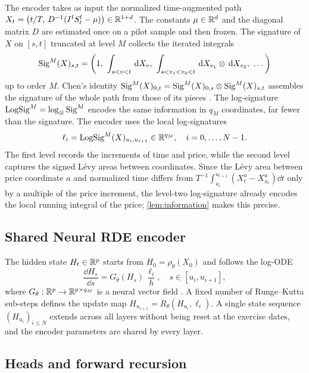 The encoder takes as input the normalized time-augmented path $X_t=\left(t/T,\,D^{-1}(I^{\mathrm f} S^{\mathrm f}_t-\mu)\right)\in\mathbb{R}^{1+d}$. The constants $\mu\in\mathbb{R}^d$ and the diagonal matrix $D$ are estimated once on a pilot sample and then frozen. The signature of $X$ on $[s,t]$ truncated at level $M$ collects the iterated integrals
\[
\Sig^{M}(X)_{s,t}=\left(1,\ \int_{s<v<t}\dd X_{v},\ \int_{s<v_1<v_2<t}\dd X_{v_1}\otimes\dd X_{v_2},\ \dots\right)
\]
up to order $M$. Chen's identity $\operatorname{Sig}^M(X)_{0,t}=\operatorname{Sig}^M(X)_{0,s}\otimes\operatorname{Sig}^M(X)_{s,t}$ assembles the signature of the whole path from those of its pieces \cite{lyons1998}. The log-signature $\operatorname{LogSig}^M=\log_\otimes\operatorname{Sig}^M$ encodes the same information in $q_M$ coordinates, far fewer than the signature. The encoder uses the local log-signatures
\begin{equation}\label{eq:local-logsig}
\ell_i=\operatorname{LogSig}^M(X)_{u_i,u_{i+1}}\in\mathbb{R}^{q_M},\quad i=0,\dots,N-1 .
\end{equation}
The first level records the increments of time and price, while the second level captures the signed L\'evy areas between coordinates. Since the L\'evy area between price coordinate $a$ and normalized time differs from $T^{-1}\int_{u_i}^{u_{i+1}}(X^a_t-X^a_{u_i})\dd t$ only by a multiple of the price increment, the level-two log-signature already encodes the local running integral of the price; \cref{lem:information} makes this precise.

\subsection{Shared Neural RDE encoder}\label{sec:encoder}

The hidden state $H_t\in\mathbb{R}^p$ starts from $H_0=\rho_\theta(X_0)$ and follows the log-ODE
\begin{equation}\label{eq:logode}
\frac{\dd H_s}{\dd s}=G_\theta(H_s)\,\frac{\ell_i}{h},\quad s\in[u_i,u_{i+1}],
\end{equation}
where $G_\theta:\mathbb{R}^p\to\mathbb{R}^{p\times q_M}$ is a neural vector field \cite{morrill2021}. A fixed number of Runge--Kutta sub-steps defines the update map $H_{u_{i+1}}=R_\theta(H_{u_i},\ell_i)$. A single state sequence $(H_{u_i})_{i\le N}$ extends across all layers without being reset at the exercise dates, and the encoder parameters are shared by every layer.

\subsection{Heads and forward recursion}\label{sec:heads}

